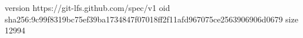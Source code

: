 version https://git-lfs.github.com/spec/v1
oid sha256:9c99f8319bc75ef39ba1734847f07018ff2f11afd967075ce2563906906d0679
size 12994
